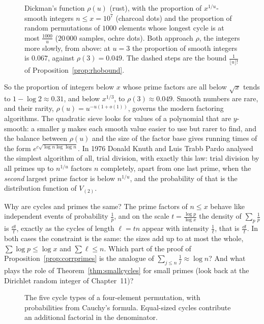 \begin{figure}[ht]
\centering{}
\caption{Dickman's function $\rho(u)$ (rust), with the proportion of $x^{1/u}$-smooth integers $n\le x=10^7$ (charcoal dots) and the proportion of random permutations of $1000$ elements whose longest cycle is at most $\frac{1000}u$ ($20\,000$ samples, ochre dots). Both
approach $\rho$, the integers more slowly, from above: at $u=3$ the proportion of smooth integers is $0.067$, against $\rho(3)=0.049$. The dashed steps are the bound $\frac1{\lfloor u\rfloor!}$ of Proposition~\ref{prop:rhobound}.}
\label{fig:rho}
\end{figure}

So the proportion of integers below $x$ whose prime factors are all below $\sqrt x$ tends to $1-\log2\approx0.31$, and below $x^{1/3}$, to $\rho(3)\approx0.049$. Smooth numbers are rare, and their rarity, $\rho(u)=u^{-u(1+o(1))}$, governs the modern factoring algorithms. The quadratic sieve looks for values of a polynomial that are $y$-smooth: a smaller $y$ makes each smooth value easier to use but rarer to find, and the balance between $\rho(u)$ and the size of the factor base gives running times of the form $e^{c\sqrt{\log n\log\log n}}$. In 1976 Donald Knuth and Luis Trabb Pardo
analysed the simplest algorithm of all, trial division, with exactly this law: trial division by all primes up to $n^{1/u}$ factors $n$ completely, apart from one last prime, when the \emph{second} largest prime factor is below $n^{1/u}$, and the probability of that is the
distribution function of $V_{(2)}$.

\begin{think}
Why are cycles and primes the same? The prime factors of $n\le x$ behave like independent events of probability $\frac1p$, and on the scale $t=\frac{\log p}{\log x}$ the density of $\sum_p\frac1p$ is $\frac{\dd t}t$, exactly as the cycles of length $\ell=tn$ appear with intensity $\frac1\ell$, that
is $\frac{\dd t}t$. In both cases the constraint is the same: the sizes add up to at most the whole, $\sum\log p\le\log x$ and $\sum\ell\le n$. Which part of the proof of Proposition~\ref{prop:corrprimes} is the analogue of $\sum_{j\le n}\frac1j\approx\log n$? And what plays the role of
Theorem~\ref{thm:smallcycles} for small primes (look back at the Dirichlet random integer of Chapter~11)?
\end{think}

\begin{figure}[ht]
\centering{}
\caption{The five cycle types of a four-element permutation, with probabilities from Cauchy's formula. Equal-sized cycles contribute an additional factorial in the denominator.}
\label{fig:v11-ch12-four-types}
\end{figure}

